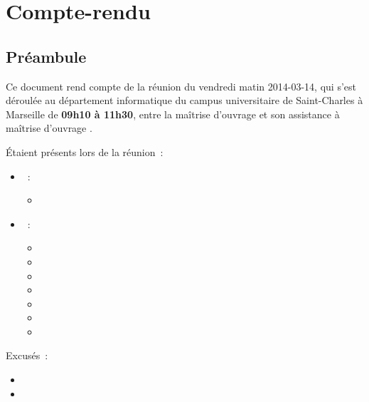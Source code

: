 \documentclass[11pt,fleqn]{report}
\begin{document}
\ZMakeCover


\chapter*{Compte-rendu}
\setcounter{chapter}{1}

\section{Préambule}
Ce document rend compte de la réunion du vendredi matin 2014-03-14, qui s'est déroulée au département informatique du campus universitaire de Saint-Charles à Marseille de \textbf{09h10 à 11h30}, entre la maîtrise d'ouvrage \mo et son assistance à maîtrise d'ouvrage \amo.

Étaient présents lors de la réunion~:
\begin{itemize}
	\item \mo~:
	\begin{itemize}
		\item \Agopian
	\end{itemize}
	\item \amo~:
	\begin{itemize}
		\item \Cadon
		\item \Julien
		\item \Lericolais
		\item \Mezelle
		\item \Pachy
		\item \SuangaWeto
		\item \Toure
	\end{itemize}
\end{itemize}
Excusés~:
\begin{itemize}
	\item \Balde
	\item \Gairoard
\end{itemize}

\end{document}

